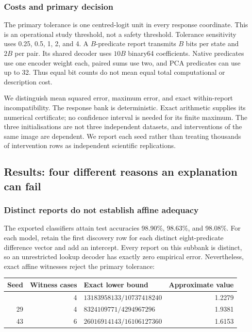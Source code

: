 \documentclass[
  british,
  11pt,
  a4paper,
]{article}
\newcounter{none} %
\begin{document}
\subsubsection{Costs and primary
decision}\label{costs-and-primary-decision}

The primary tolerance is one centred-logit unit in every response
coordinate. This is an operational study threshold, not a safety
threshold. Tolerance sensitivity uses 0.25, 0.5, 1, 2, and 4. A
\(B\)-predicate report transmits \(B\) bits per state and \(2B\) per
pair. Its shared decoder uses \(10B\) binary64 coefficients. Native
predicates use one encoder weight each, paired sums use two, and PCA
predicates can use up to 32. Thus equal bit counts do not mean equal
total computational or description cost.

We distinguish mean squared error, maximum error, and exact
within-report incompatibility. The response bank is deterministic. Exact
arithmetic supplies its numerical certificate; no confidence interval is
needed for its finite maximum. The three initialisations are not three
independent datasets, and interventions of the same image are dependent.
We report each seed rather than treating thousands of intervention rows
as independent scientific replications.

\subsection{Results: four different reasons an explanation can
fail}\label{results-four-different-reasons-an-explanation-can-fail}

\subsubsection{Distinct reports do not establish affine
adequacy}\label{distinct-reports-do-not-establish-affine-adequacy}

The exported classifiers attain test accuracies 98.90\%, 98.63\%, and
98.08\%. For each model, retain the first discovery row for each
distinct eight-predicate difference vector and add an intercept. Every
report on this subbank is distinct, so an unrestricted lookup decoder
has exactly zero empirical error. Nevertheless, exact affine witnesses
reject the primary tolerance:

{\def\LTcaptype{none} %
\begin{longtable}[]{@{}rrlr@{}}
\toprule\noalign{}
Seed & Witness cases & Exact lower bound & Approximate value \\
\midrule\noalign{}
\endhead
\bottomrule\noalign{}
\endlastfoot
17 & 4 & \(13183958133/10737418240\) & 1.2279 \\
29 & 4 & \(8324109771/4294967296\) & 1.9381 \\
43 & 6 & \(26016914143/16106127360\) & 1.6153 \\
\end{longtable}
}
\end{document}
